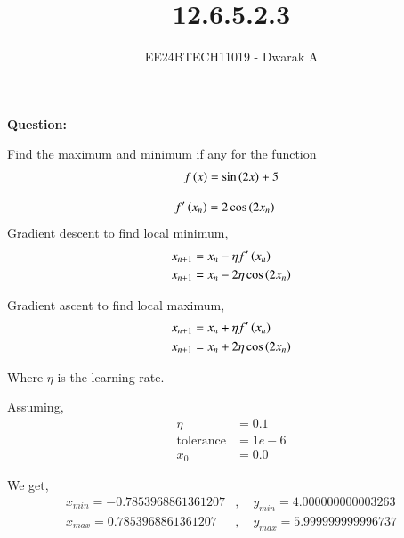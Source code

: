 \documentclass[journal]{IEEEtran}
\begin{document}

\vspace{3cm}

\title{12.6.5.2.3}
\author{EE24BTECH11019 - Dwarak A}
{\let\newpage\relax\maketitle}

\renewcommand{\thefigure}{\theenumi}
\renewcommand{\thetable}{\theenumi}
\setlength{\intextsep}{10pt} %


\renewcommand{\thetable}{\theenumi}

\textbf{Question:}

Find the maximum and minimum if any for the function
\begin{align}
    f\left(x\right) = \sin{\ensuremath{\left(2x\right)}}+5 
\end{align}

\solution
\begin{align}
    f^\prime\left(x_{n}\right) &= 2\cos{\ensuremath{\left(2x_{n}\right)}}
\end{align}
Gradient descent to find local minimum,
\begin{align}
    x_{n+1} &= x_{n} - \eta f^\prime\left(x_{n}\right) \\
    x_{n+1} &= x_{n} - 2\eta \cos{\ensuremath{\left(2x_{n}\right)}}
\end{align}

Gradient ascent to find local maximum,
\begin{align}
    x_{n+1} &= x_{n} + \eta f^\prime\left(x_{n}\right) \\
    x_{n+1} &= x_{n} + 2\eta \cos{\ensuremath{\left(2x_{n}\right)}}
\end{align}

Where $\eta$ is the learning rate.

Assuming,
\begin{align}
    \eta &= 0.1 \\
    \text{tolerance} &= 1e-6 \\
    x_{0} &= 0.0
\end{align}

We get,
\begin{align}
    x_{min} = -0.7853968861361207&,\quad y_{min} = 4.000000000003263 \\
    x_{max} = 0.7853968861361207&,\quad y_{max} = 5.999999999996737
\end{align}
\end{document}

